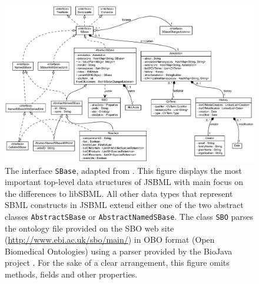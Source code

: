 \documentclass[
  BCOR12mm,
  letterpaper,
  11pt,
  headsepline,
  pointlessnumbers,
  tablecaptionabove,
  onelinecaption,
  headinclude,
  appendixprefix,
  idxtotoc,
  bibtotoc,
  twoside,
  titlepage
]{scrartcl}
\begin{document}
\begin{figure}[htb]
 \centering
 \includegraphics[width=\textwidth]{img/SBase}
 \caption[The interface \texttt{SBase}]{The interface \texttt{SBase}, adapted
from \citep{Draeger2011}. This figure displays the most important top-level data
structures of JSBML with main focus on the differences to libSBML. All other
data types that represent SBML constructs in JSBML extend either one of the two
abstract classes \texttt{AbstractSBase} or \texttt{AbstractNamedSBase}. The
class \texttt{SBO} parses the ontology file provided on the SBO web
site (\url{http://www.ebi.ac.uk/sbo/main/}) in OBO format (Open
Biomedical Ontologies) using a parser provided by the BioJava project
\citep{Holland2008}. For the sake of a clear arrangement, this figure omits
methods, fields and other properties.}
 \label{fig:SBase}
\end{figure}
\end{document}
